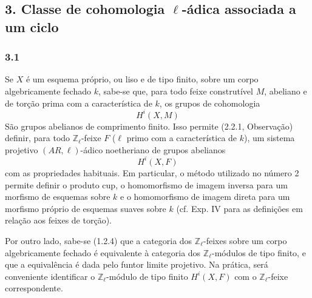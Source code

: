 \subsection*{3. Classe de cohomologia \(\ell\)-ádica associada a um ciclo}

\subsubsection*{3.1}
Se \(X\) é um esquema próprio, ou liso e de tipo finito, sobre um corpo algebricamente fechado \(k\), sabe-se que, para todo feixe construtível \(M\), abeliano e de torção prima com a característica de \(k\), os grupos de cohomologia
\[
H^i(X,M)
\]
São grupos abelianos de comprimento finito. Isso permite (2.2.1, Observação) definir, para todo \(\mathbb Z_\ell\)-feixe \(F\) (\(\ell\) primo com a característica de \(k\)), um sistema projetivo \((AR,\ell)\)-ádico noetheriano de grupos abelianos
\[
H^i(X,F)
\]
com as propriedades habituais. Em particular, o método utilizado no número 2 permite definir o produto cup, o homomorfismo de imagem inversa para um morfismo de esquemas sobre \(k\) e o homomorfismo de imagem direta para um morfismo próprio de esquemas suaves sobre \(k\) (cf. Exp. IV para as definições em relação aos feixes de torção).

Por outro lado, sabe-se (1.2.4) que a categoria dos \(\mathbb Z_\ell\)-feixes sobre um corpo algebricamente fechado é equivalente à categoria dos \(\mathbb Z_\ell\)-módulos de tipo finito, e que a equivalência é dada pelo funtor limite projetivo. Na prática, será conveniente identificar o \(\mathbb Z_\ell\)-módulo de tipo finito \(H^i(X,F)\) com o \(\mathbb Z_\ell\)-feixe correspondente.
